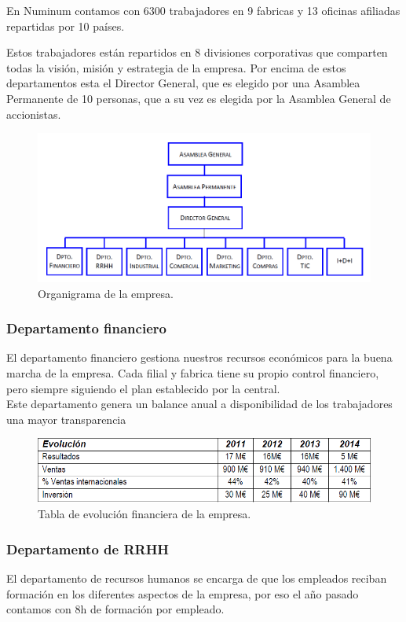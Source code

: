 \documentclass[twoside]{article}
\begin{document}
En Numinum contamos con 6300 trabajadores en 9 fabricas y 13 oficinas afiliadas repartidas por 10 países.\par
Estos trabajadores están repartidos en 8 divisiones corporativas que comparten todas la visión, misión y estrategia de la empresa.
Por encima de estos departamentos esta el Director General, que es elegido por una Asamblea Permanente de 10 personas, que a su vez es elegida por la Asamblea General de accionistas.

\begin{figure}[ht!]
	\includegraphics[width=130mm]{Organization.png}
	\caption{Organigrama de la empresa.}
	\label{fig:organization}
\end{figure}

\subsubsection{Departamento financiero}
El departamento financiero gestiona nuestros recursos económicos para la buena marcha de la empresa. Cada filial y fabrica tiene su propio control financiero, pero siempre siguiendo el plan establecido por la central.\\
Este departamento genera un balance anual a disponibilidad de los trabajadores una mayor transparencia 

\begin{figure}[ht!]
	\includegraphics[width=130mm]{Finances.png}
	\caption{Tabla de evolución financiera de la empresa.}
	\label{fig:finances}
\end{figure}

\subsubsection{Departamento de RRHH}
El departamento de recursos humanos se encarga de que los empleados reciban formación en los diferentes aspectos de la empresa, por eso el año pasado contamos con 8h de formación por empleado.
\end{document}
